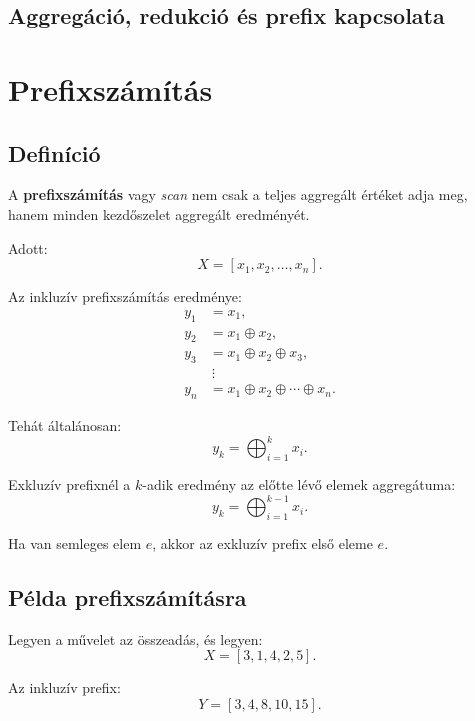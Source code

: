 \subsection{Aggregáció, redukció és prefix kapcsolata}

\begin{center}

\end{center}

\begin{center}

\end{center}

\section{Prefixszámítás}

\subsection{Definíció}

A \textbf{prefixszámítás} vagy \emph{scan} nem csak a teljes aggregált értéket adja meg, hanem minden kezdőszelet aggregált eredményét.

Adott:
\[
  X=[x_1,x_2,\ldots,x_n].
\]

Az inkluzív prefixszámítás eredménye:
\[
\begin{aligned}
  y_1 &= x_1,\\
  y_2 &= x_1\oplus x_2,\\
  y_3 &= x_1\oplus x_2\oplus x_3,\\
  &\ \vdots\\
  y_n &= x_1\oplus x_2\oplus\cdots\oplus x_n.
\end{aligned}
\]

Tehát általánosan:
\[
  y_k=\bigoplus_{i=1}^{k} x_i.
\]

Exkluzív prefixnél a $k$-adik eredmény az előtte lévő elemek aggregátuma:
\[
  y_k=\bigoplus_{i=1}^{k-1}x_i.
\]

Ha van semleges elem $e$, akkor az exkluzív prefix első eleme $e$.

\subsection{Példa prefixszámításra}

Legyen a művelet az összeadás, és legyen:
\[
  X=[3,1,4,2,5].
\]

Az inkluzív prefix:
\[
  Y=[3,4,8,10,15].
\]

